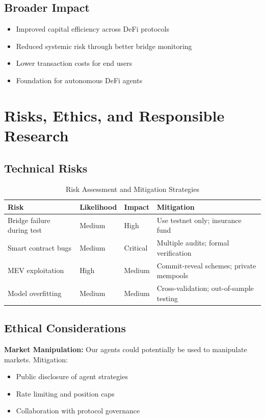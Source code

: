 \documentclass[11pt,a4paper]{article}
\begin{document}
\subsection{Broader Impact}

\begin{itemize}[leftmargin=2em]
    \item Improved capital efficiency across DeFi protocols
    \item Reduced systemic risk through better bridge monitoring
    \item Lower transaction costs for end users
    \item Foundation for autonomous DeFi agents
\end{itemize}

\section{Risks, Ethics, and Responsible Research}\label{sec:risks}

\subsection{Technical Risks}

\begin{table}[H]
\centering
\caption{Risk Assessment and Mitigation Strategies}
\label{tab:risks}
\begin{tabular}{@{}p{3cm}p{2cm}p{3cm}p{4cm}@{}}
\toprule
\textbf{Risk} & \textbf{Likelihood} & \textbf{Impact} & \textbf{Mitigation} \\
\midrule
Bridge failure during test & Medium & High & Use testnet only; insurance fund \\
Smart contract bugs & Medium & Critical & Multiple audits; formal verification \\
MEV exploitation & High & Medium & Commit-reveal schemes; private mempools \\
Model overfitting & Medium & Medium & Cross-validation; out-of-sample testing \\
\bottomrule
\end{tabular}
\end{table}

\subsection{Ethical Considerations}

\textbf{Market Manipulation:} Our agents could potentially be used to manipulate markets. Mitigation:
\begin{itemize}[leftmargin=2em]
    \item Public disclosure of agent strategies
    \item Rate limiting and position caps
    \item Collaboration with protocol governance
\end{itemize}
\end{document}
